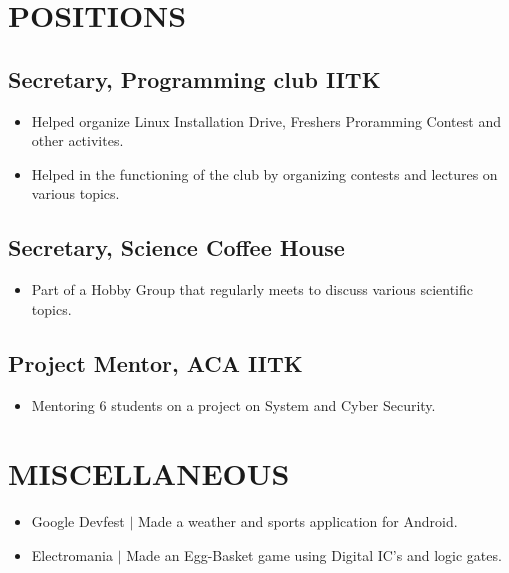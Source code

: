 \documentclass{article}
\begin{document}
 \section*{POSITIONS}
    \subsection*{Secretary, Programming club  IITK}
        \begin{itemize}
            \itemsep0em
            \item {Helped organize Linux Installation Drive, Freshers Proramming Contest and other activites.}
            \item {Helped in the functioning of the club by organizing contests and lectures on various topics.}
        \end{itemize}
        
    \subsection*{Secretary, Science Coffee House}
        \begin{itemize}
            \itemsep0em
            \item Part of a Hobby Group that regularly meets to discuss various scientific topics.
        \end{itemize}
    
    \subsection*{Project Mentor, ACA IITK}
        \begin{itemize}
            \itemsep0em
            \item Mentoring 6 students on a project on System and Cyber Security.
        \end{itemize}
 
 \section*{MISCELLANEOUS}
    \begin{itemize}
        \itemsep0em
        \item Google Devfest $|$ Made a weather and sports application for Android. 
        \item Electromania $|$ Made an Egg-Basket game using Digital IC’s and logic gates.
    \end{itemize}
\end{document}
